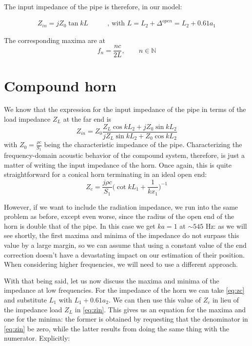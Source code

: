 \documentclass[a4paper]{article}
\begin{document}
The input impedance of the pipe is therefore, in our model:

\begin{align*}
	Z_{in} = jZ_0 \tan{kL} \qquad & \text{, with } L = L_2 + \Delta^{open} = L_2 + 0.61a_1
\end{align*}

The corresponding maxima are at
$$ f_n = \frac{nc}{2L}, \qquad n \in \mathbb{N} $$

\section{Compound horn}
We know that the expression for the input impedance of the pipe in terms of the load impedance $Z_L$ at the far end is
\begin{equation}\label{eq:zin}
	Z_{in} = Z_0 \frac{Z_L \cos{kL_2} + jZ_0\sin{kL_2}}{jZ_L \sin{kL_2} + Z_0 \cos{kL_2}}
\end{equation}
with $Z_0 = \frac{\rho c}{S_1}$ being the characteristic impedance of the pipe. Characterizing the frequency-domain acoustic behavior of the compound system, therefore, is just a matter of writing the input impedance of the horn. Once again, this is quite straightforward for a conical horn terminating in an ideal open end:
\begin{equation}\label{eq:zc}
	Z_c = \frac{j\rho c}{S_1} \biggl( \cot{kL_1} + \frac{1}{kx_1} \biggr)^{-1}
\end{equation}

However, if we want to include the radiation impedance, we run into the same problem as before, except even worse, since the radius of the open end of the horn is double that of the pipe. In this case we get $ka = 1$ at $\sim 545$ Hz: as we will see shortly, the first maxima and minima of the impedance do not surpass this value by a large margin, so we can assume that using a constant value of the end correction doesn't have a devastating impact on our estimation of their position. When considering higher frequencies, we will need to use a different approach.

With that being said, let us now discuss the maxima and minima of the impedance at low frequencies. For the impedance of the horn we can take \ref{eq:zc} and substitute $L_1$ with $L_1 + 0.61a_2 $. We can then use this value of $Z_c$ in lieu of the impedance load $Z_L$ in \ref{eq:zin}. This gives us an equation for the maxima and one for the minima: the former is obtained by requesting that the denominator in \ref{eq:zin} be zero, while the latter results from doing the same thing with the numerator. Explicitly:
\end{document}
